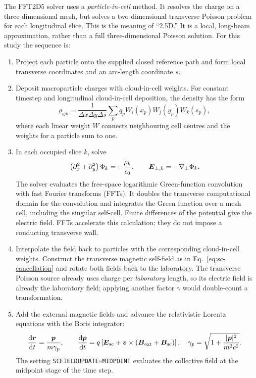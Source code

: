 The FFT2D5 solver uses a \emph{particle-in-cell} method. It resolves the charge
on a three-dimensional mesh, but solves a two-dimensional transverse Poisson
problem for each longitudinal slice. This is the meaning of ``2.5D.'' It is
a local, long-beam approximation, rather than a full three-dimensional Poisson
solution. For this study the sequence is:
\begin{enumerate}
 \item Project each particle onto the supplied closed reference path and form
 local transverse coordinates and an arc-length coordinate $s$.
 \item Deposit macroparticle charges with cloud-in-cell weights. For constant
 timestep and longitudinal cloud-in-cell deposition, the density has the form
 \begin{equation}
  \rho_{ijk}=\frac{1}{\Delta x\Delta y\Delta s}
       \sum_p q_p W_i(x_p)W_j(y_p)W_k(s_p),
  \label{eq:sc-cic}
 \end{equation}
 where each linear weight $W$ connects neighbouring cell centres and the
 weights for a particle sum to one.
 \item In each occupied slice $k$, solve
 \begin{equation}
  \left(\partial_x^2+\partial_y^2\right)\Phi_k
        =-\frac{\rho_k}{\epsilon_0},\qquad
  \boldsymbol{E}_{\perp,k}=-\nabla_\perp\Phi_k.
  \label{eq:sc-poisson}
 \end{equation}
 The solver evaluates the free-space logarithmic Green-function convolution
 with fast Fourier transforms (FFTs). It doubles the transverse computational
 domain for the convolution and integrates the Green function over a mesh
 cell, including the singular self-cell. Finite differences of the potential
 give the electric field. FFTs accelerate this calculation; they do not impose
 a conducting transverse wall.
 \item Interpolate the field back to particles with the corresponding
 cloud-in-cell weights. Construct the transverse magnetic self-field as in
 Eq.~\eqref{eq:sc-cancellation} and rotate both fields back to the laboratory.
 The transverse Poisson source already uses charge per \emph{laboratory}
 length, so its electric field is already the laboratory field; applying
 another factor $\gamma$ would double-count a transformation.
 \item Add the external magnetic fields and advance the relativistic Lorentz
 equations with the Boris integrator:
 \begin{equation}
  \frac{\mathrm d\boldsymbol{r}}{\mathrm dt}=\frac{\boldsymbol{p}}{m\gamma_p},\qquad
  \frac{\mathrm d\boldsymbol{p}}{\mathrm dt}
       =q\left[\boldsymbol{E}_{\rm sc}+\boldsymbol{v}\times
                       (\boldsymbol{B}_{\rm ext}+\boldsymbol{B}_{\rm sc})\right],
  \quad\gamma_p=\sqrt{1+\frac{|\boldsymbol{p}|^2}{m^2c^2}}.
  \label{eq:sc-lorentz}
 \end{equation}
 The setting \texttt{SCFIELDUPDATE=MIDPOINT} evaluates the collective field at
 the midpoint stage of the time step.
\end{enumerate}
